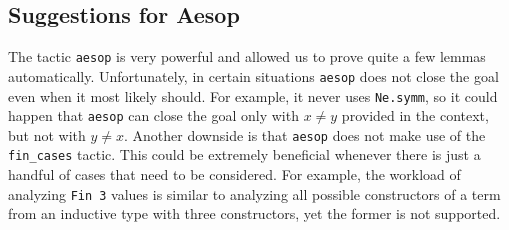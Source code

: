 \subsection{Suggestions for Aesop}

The tactic \texttt{aesop} is very powerful and allowed us to prove quite a few lemmas automatically. Unfortunately, in certain situations \texttt{aesop} does not close the goal even when it most likely should. For example, it never uses \texttt{Ne.symm}, so it could happen that \texttt{aesop} can close the goal only with $x \neq y$ provided in the context, but not with $y \neq x$. Another downside is that \texttt{aesop} does not make use of the \texttt{fin\_cases} tactic. This could be extremely beneficial whenever there is just a handful of cases that need to be considered. For example, the workload of analyzing \texttt{Fin 3} values is similar to analyzing all possible constructors of a term from an inductive type with three constructors, yet the former is not supported.
